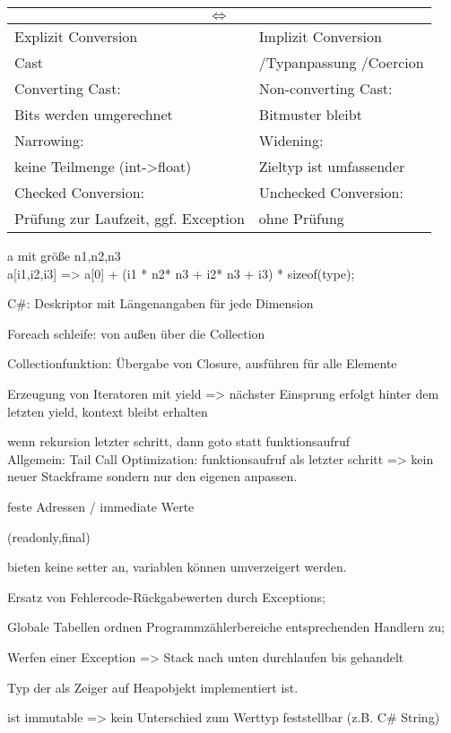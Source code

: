 \begin{tabular}{|l|l|}
\hline
\multicolumn{2}{|c|}{$\Leftrightarrow$}\\
\hline
Explizit Conversion  & Implizit Conversion \\
Cast &/Typanpassung /Coercion  \\
\hline
Converting Cast:  & Non-converting Cast: \\
Bits werden umgerechnet & Bitmuster bleibt \\
\hline
Narrowing:  & Widening:  \\
keine Teilmenge (int->float)&Zieltyp ist umfassender\\
\hline
Checked Conversion:   &Unchecked Conversion:  \\
Prüfung zur Laufzeit, ggf. Exception &ohne Prüfung\\
\hline
\end{tabular}

%


\newpage
{}
 a mit größe n1,n2,n3 \\
a[i1,i2,i3] =>  a[0] + (i1 * n2* n3 + i2* n3 + i3) * sizeof(type);

C\#: Deskriptor mit Längenangaben für jede Dimension

Foreach schleife: von außen über die Collection

 Collectionfunktion: Übergabe von Closure, ausführen für alle Elemente

Erzeugung von Iteratoren mit yield => nächster Einsprung erfolgt hinter dem letzten yield, kontext bleibt erhalten

 wenn rekursion letzter schritt, dann goto statt funktionsaufruf\\
Allgemein: Tail Call Optimization: funktionsaufruf als letzter schritt => kein neuer Stackframe sondern nur den eigenen anpassen.



 feste Adressen / immediate Werte

 (readonly,final)

 bieten keine setter an, variablen können umverzeigert werden.

Ersatz von Fehlercode-Rückgabewerten durch Exceptions;

Globale Tabellen ordnen Programmzählerbereiche entsprechenden Handlern zu; 

 Werfen einer Exception => Stack nach unten durchlaufen bis gehandelt


Typ der als Zeiger auf Heapobjekt implementiert ist.

 ist immutable => kein Unterschied zum Werttyp feststellbar (z.B. C\# String)

